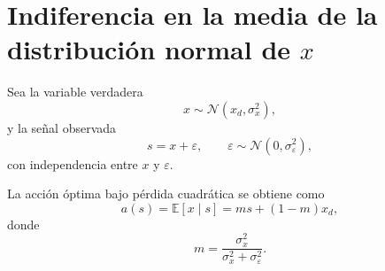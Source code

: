 







\section{Indiferencia en la media de la distribución normal de $x$}
\label{sec:indiferencia_media}

Sea la variable verdadera
\begin{equation}
x \sim \mathcal{N}(x_d, \sigma_x^2),
\label{eq:xdistr}
\end{equation}
y la señal observada
\begin{equation}
s = x + \varepsilon, 
\qquad 
\varepsilon \sim \mathcal{N}(0, \sigma_\varepsilon^2),
\label{eq:signal}
\end{equation}
con independencia entre $x$ y $\varepsilon$.

La acción óptima bajo pérdida cuadrática se obtiene como
\begin{equation}
a(s) = \mathbb{E}[x \mid s] = m s + (1 - m)x_d,
\label{eq:opt_action}
\end{equation}
donde
\begin{equation}
m = \frac{\sigma_x^2}{\sigma_x^2 + \sigma_\varepsilon^2}.
\label{eq:m_def}
\end{equation}

